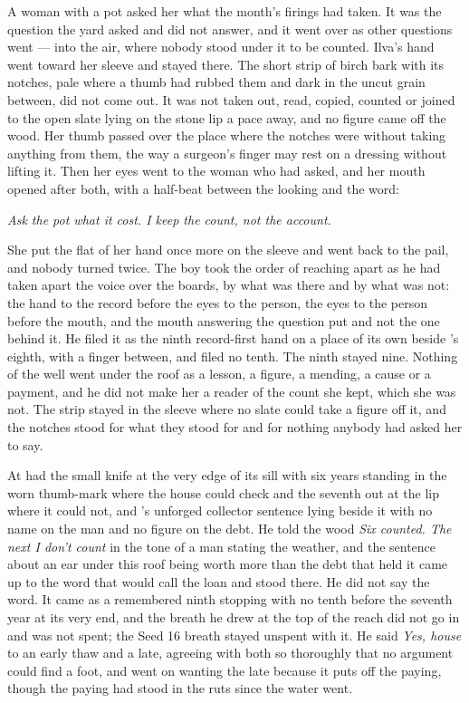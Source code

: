 A woman with a pot asked her what the month's firings had taken. It was the question the yard asked and did not answer, and it went over  as other questions went --- into the air, where nobody stood under it to be counted. Ilva's hand went toward her sleeve and stayed there. The short strip of birch bark with its notches, pale where a thumb had rubbed them and dark in the uncut grain between, did not come out. It was not taken out, read, copied, counted or joined to the open slate lying on the stone lip a pace away, and no figure came off the wood. Her thumb passed over the place where the notches were without taking anything from them, the way a surgeon's finger may rest on a dressing without lifting it. Then her eyes went to the woman who had asked, and her mouth opened after both, with a half-beat between the looking and the word:

\emph{Ask the pot what it cost. I keep the count, not the account.}

She put the flat of her hand once more on the sleeve and went back to the pail, and nobody turned twice. The boy took the order of reaching apart as he had taken apart the voice over the boards, by what was there and by what was not: the hand to the record before the eyes to the person, the eyes to the person before the mouth, and the mouth answering the question put and not the one behind it. He filed it as the ninth record-first hand on a place of its own beside 's eighth, with a finger between, and filed no tenth. The ninth stayed nine. Nothing of the well went under the roof as a lesson, a figure, a mending, a cause or a payment, and he did not make her a reader of the count she kept, which she was not. The strip stayed in the sleeve where no slate could take a figure off it, and the notches stood for what they stood for and for nothing anybody had asked her to say.

\scenebreak

At   had the small knife at the very edge of its sill with six years standing in the worn thumb-mark where the house could check and the seventh out at the lip where it could not, and 's unforged collector sentence lying beside it with no name on the man and no figure on the debt. He told the wood \emph{Six counted. The next I don't count} in the tone of a man stating the weather, and the sentence about an ear under this roof being worth more than the debt that held it came up to the word that would call the loan and stood there. He did not say the word. It came as a remembered ninth stopping with no tenth before the seventh year at its very end, and the breath he drew at the top of the reach did not go in and was not spent; the Seed 16 breath stayed unspent with it. He said \emph{Yes, house} to an early thaw and a late, agreeing with both so thoroughly that no argument could find a foot, and went on wanting the late because it puts off the paying, though the paying had stood in the ruts since the water went.

